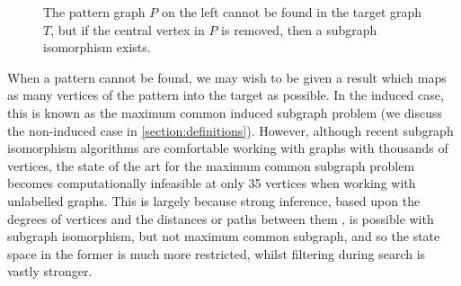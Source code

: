 \documentclass[letterpaper]{article}
\newcommand{\citep}[1]{\cite{#1}}
\theoremstyle{definition}
\begin{document}
\begin{figure}[b]
    \centering
    \caption{The pattern graph $P$ on the left cannot be found in the target graph $T$, but if
    the central vertex in $P$ is removed, then a subgraph isomorphism exists.}
    \label{figure:subgraphexample}
\end{figure}

When a pattern cannot be found, we may wish to be given a result which maps as many vertices of the
pattern into the target as possible. In the induced case, this is known as the maximum common
induced subgraph problem (we discuss the non-induced case in \cref{section:definitions}). However,
although recent subgraph isomorphism algorithms are comfortable working with graphs with thousands
of vertices, the state of the art for the maximum common subgraph problem
\citep{DBLP:conf/cp/McCreeshNPS16} becomes computationally infeasible at only 35 vertices when
working with unlabelled graphs. This is largely because strong inference, based upon the degrees of
vertices \citep{DBLP:journals/ai/Solnon10} and the distances or paths between them
\citep{DBLP:conf/cp/AudemardLMGP14,DBLP:conf/cp/McCreeshP15}, is possible with subgraph isomorphism,
but not maximum common subgraph, and so the state space in the former is much more restricted,
whilst filtering during search is vastly stronger.
\end{document}

